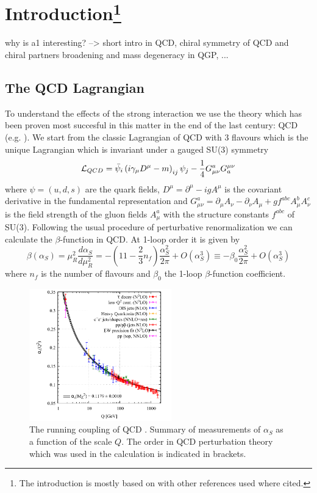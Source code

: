 \section{Introduction\footnote{The introduction is mostly based on \cite{ChiSym} with other references used where cited.}}
\label{sec:Introduction}

why is a1 interesting? --> short intro in QCD, chiral symmetry of QCD and chiral partners
broadening and mass degeneracy in QGP, ...
\subsection{The QCD Lagrangian}
To understand the effects of the strong interaction we use the theory which has been proven most succesful in this matter in the end of the last century: QCD (e.g. \cite{QCDEllis}). We start from the classic Lagrangian of QCD with 3 flavours which is the unique Lagrangian which is invariant under a gauged SU(3) symmetry
\begin{equation}
\label{eqn:LQCD}
\mathcal{L}_{QCD} = \bar{\psi}_i \left( i\gamma_{\mu} D^{\mu} - m \right)_{ij} \psi_j - \frac{1}{4} G_{\mu\nu}^a G^{\mu\nu}_a
\end{equation}
where $\psi = \left( u,d,s \right)$ are the quark fields, $D^{\mu} = \partial^{\mu} -igA^{\mu}$ is the covariant derivative in the fundamental representation and $G_{\mu\nu}^a = \partial_{\mu}A_{\nu} - \partial_{\nu}A_{\mu} + g f^{abc} A_{\mu}^b A_{\nu}^c$ is the field strength of the gluon fields $A_{\mu}^a$ with the structure constants $f^{abc}$ of SU(3).
Following the usual procedure of perturbative renormalization we can calculate the $\beta$-function in QCD. At 1-loop order it is given by
\begin{equation}
\label{eqn:beta}
\beta(\alpha_S) = \mu_R^2 \frac{d\alpha_S}{d\mu_R^2} = - \left( 11 - \frac{2}{3} n_f \right) \frac{\alpha_S^2}{2\pi} + O(\alpha_S^3)  \equiv - \beta_0 \frac{\alpha_S^2}{2\pi} + O(\alpha_S^3)
\end{equation}
where $n_f$ is the number of flavours and $\beta_0$ the 1-loop $\beta$-function coefficient.
\begin{figure}[b]
	\centering
	\includegraphics[width=0.55\textwidth]{Figures/alphaQCD}
	\caption{The running coupling of QCD \cite{PDG2018}. Summary of measurements of $\alpha_S$ as a function of the scale $Q$. The order in QCD perturbation theory which was used in the calculation is indicated in brackets.}
	\label{fig:alpha}
\end{figure}
